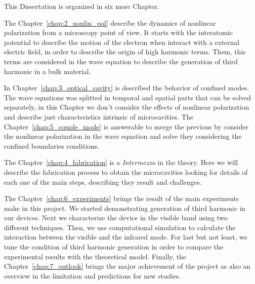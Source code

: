This Dissertation is organized in six more Chapter. 

The Chapter~\ref{chap:2_nonlin_pol} describe the dynamics of nonlinear polarization from a microscopy point of view. It starts with the interatomic potential to describe the motion of the electron when interact with a external electric field, in order to describe the origin of high harmonic terms. Them, this terms are considered in the wave equation to describe the generation of third harmonic in a bulk material.     

In Chapter~\ref{chap:3_optical_cavity} is described the behavior of confined modes. The wave equations was splitted in temporal and spatial parts that can be solved separately, in this Chapter we don't consider the effects of nonlinear polarization and describe just characteristics intrinsic of microcavities. The Chapter~\ref{chap:5_couple_mode} is answerable to merge the previous by consider the nonlinear polarization in the wave equation and solve they considering the confined boundaries conditions. 

The Chapter~\ref{chap:4_fabrication} is a \textit{Intermezzo} in the theory. Here we will describe the fabrication process to obtain the microcavities looking for details of each one of the main steps, describing they result and challenges.

The Chapter~\ref{chap:6_experiments} brings the result of the main experiments make in this project. We  started demonstrating generation of third harmonic in our devices. Next we characterize the device in the visible band using two different techniques. Then, we use computational simulation to calculate the interaction between the visible and the infrared mode. For last but not least, we tune the condition of third harmonic generation in order to compare the experimental results with the theoretical model. Finally, the Chapter~\ref{chap:7_outlook} brings the major achievement of the project as also an overview in the limitation and predictions for new studies. 